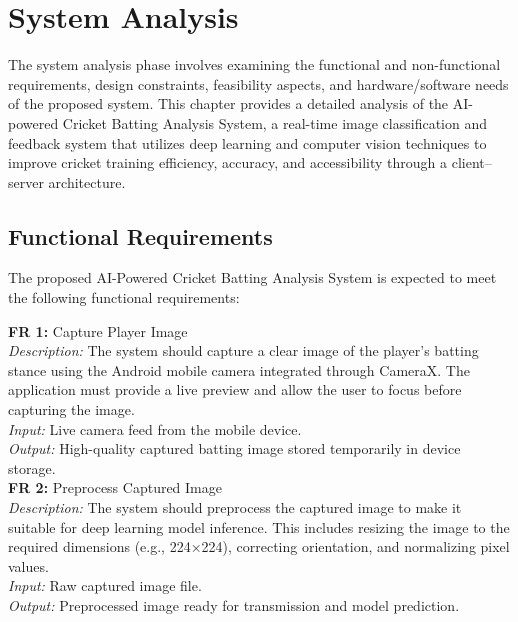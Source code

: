 \chapter{System Analysis}
\label{C3} %
\graphicspath{{Figures/Chapter-3figs/PDF/}{Figures/Chapter-3figs/}}
The system analysis phase involves examining the functional and non-functional requirements, design constraints, feasibility aspects, and hardware/software needs of the proposed system. This chapter provides a detailed analysis of the AI-powered Cricket Batting Analysis System, a real-time image classification and feedback system that utilizes deep learning and computer vision techniques to improve cricket training efficiency, accuracy, and accessibility through a client–server architecture.
\section{Functional Requirements} \label{S3.1}
The proposed AI-Powered Cricket Batting Analysis System is expected to meet the following functional requirements:

\noindent\textbf{FR 1:} Capture Player Image\\
\textit{Description:} The system should capture a clear image of the player’s batting stance using the Android mobile camera integrated through CameraX. The application must provide a live preview and allow the user to focus before capturing the image.\\
\textit{Input:} Live camera feed from the mobile device.\\
\textit{Output:} High-quality captured batting image stored temporarily in device storage. \\

\noindent\textbf{FR 2:} Preprocess Captured Image\\
\textit{Description:} The system should preprocess the captured image to make it suitable for deep learning model inference. This includes resizing the image to the required dimensions (e.g., 224×224), correcting orientation, and normalizing pixel values.\\
\textit{Input:} Raw captured image file.\\
\textit{Output:} Preprocessed image ready for transmission and model prediction.\\

